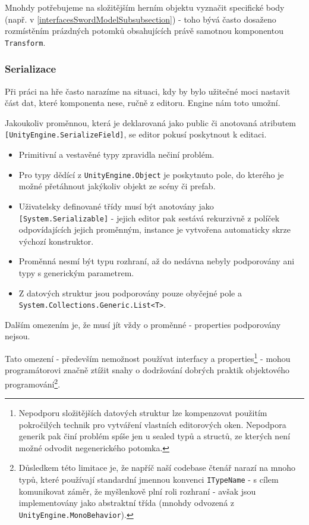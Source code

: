 Mnohdy potřebujeme na složitějším herním objektu vyznačit specifické body (např. v \ref{interfacesSwordModelSubsubsection}) - toho bývá často dosaženo rozmístěním prázdných potomků obsahujících právě samotnou komponentou \texttt{Transform}.

\subsubsection*{Serializace} \label{gameObjectSerializationSubSubSection}

Při práci na hře často narazíme na situaci, kdy by bylo užitečné moci nastavit část dat, které komponenta nese, ručně z editoru. Engine nám toto umožní.

Jakoukoliv proměnnou, která je deklarovaná jako public či anotovaná atributem \texttt{[UnityEngine.SerializeField]}, se editor pokusí poskytnout k editaci.
\begin{itemize}
    \item Primitivní a vestavěné typy zpravidla nečiní problém.
    \item Pro typy dědící z \texttt{UnityEngine.Object} je poskytnuto pole, do kterého je možné přetáhnout jakýkoliv objekt ze scény či prefab.
    \item Uživatelsky definované třídy musí být anotovány jako \texttt{[System.Serializable]} - jejich editor pak sestává rekurzivně z políček odpovídajících jejich proměnným, instance je vytvořena automaticky skrze výchozí konstruktor.
    \item Proměnná nesmí být typu rozhraní, až do nedávna nebyly podporovány ani typy s generickým parametrem.
    \item Z datových struktur jsou podporovány pouze obyčejné pole a \texttt{System.Collections.Generic.List<T>}.
\end{itemize}
Dalším omezením je, že musí jít vždy o proměnné - properties podporovány nejsou.

Tato omezení - především nemožnost používat interfacy a properties\footnote{Nepodporu složitějších datových struktur lze kompenzovat použitím pokročilých technik pro vytváření vlastních editorových oken. Nepodpora generik pak činí problém spíše jen u sealed typů a structů, ze kterých není možné odvodit negenerického potomka.} - mohou programátorovi značně ztížit snahy o dodržování dobrých praktik objektového programování\footnote{Důsledkem této limitace je, že napříč naší codebase čtenář narazí na mnoho typů, které používají standardní jmennou konvenci \texttt{ITypeName} - s cílem komunikovat záměr, že myšlenkově plní roli rozhraní - avšak jsou implementovány jako abstraktní třída (mnohdy odvozená z \texttt{UnityEngine.MonoBehavior}).}.

